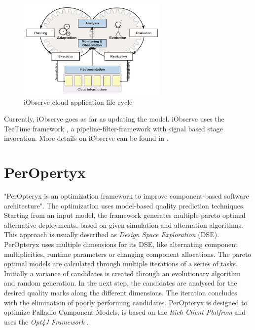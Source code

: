 \begin{figure}[h]
	\centering
	\includegraphics[width=0.65\textwidth]{pictures/iObserve_principle}
	\caption{iObserve cloud application life cycle \cite{Heinrich.2016b}}
	\label{fig:intro:iObserve}
\end{figure}

Currently, iObserve goes as far as updating the model. iObserve uses the TeeTime framework \cite{teetime.16.05.2017}, a pipeline-filter-framework with signal based stage invocation. More details on iObserve can be found in \cite{Heinrich.2016b}\cite{Heinrich.2016}.

\section{PerOpertyx}
\label{sec:Foundations:peropteryx}

"PerOpteryx is an optimization framework to improve component-based software architecture"\cite{PerOpteryx.b}. The optimization uses model-based quality prediction techniques. Starting from an input model, the framework generates multiple pareto optimal alternative deployments, based on given simulation and alternation algorithms. This approach is usually described as \textit{Design Space Exploration} (DSE). PerOpteryx uses multiple dimensions for its DSE, like alternating component multiplicities, runtime parameters or changing component allocations. The pareto optimal models are calculated through multiple iterations of a series of tasks. Initially a variance of candidates is created through an evolutionary algorithm and random generation. In the next step, the candidates are analysed for the desired quality marks along the different dimensions. The iteration concludes with the elimination of poorly performing candidates. PerOpteryx is designed to optimize Palladio Component Models, is based on the \textit{Rich Client Platfrom} and uses the \textit{Opt4J Framework} \cite{Martens.2010}.


